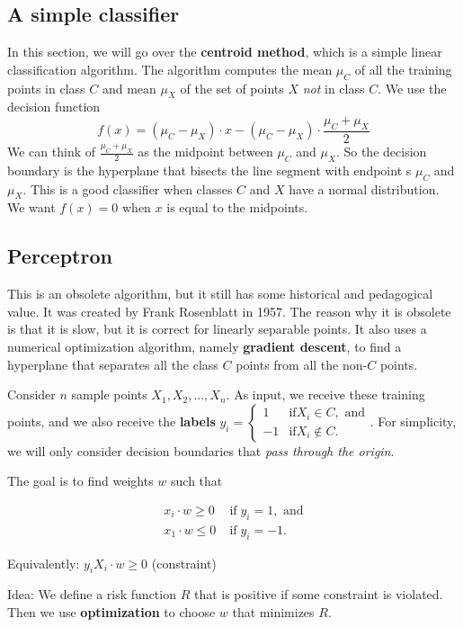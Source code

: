 \subsection{A simple classifier}
In this section, we will go over the \textbf{centroid method}, which is a simple linear classification algorithm.
The algorithm computes the mean $\mu_C$ of all the training points in class $C$ and mean $\mu_X$ of the set of points $X$ \textit{not} in class $C$.
We use the decision function
$$f(x) = (\mu_C - \mu_X) \cdot x - (\mu_C - \mu_X )\cdot \frac{\mu_C + \mu_X}{2}$$
We can think of $\frac{\mu_C + \mu_X}{2}$ as the midpoint between $\mu_C$ and $\mu_X$.
So the decision boundary is the hyperplane that bisects the line segment with endpoint s $\mu_C$ and $\mu_X$.
This is a good classifier when classes $C$ and $X$ have a normal distribution.
We want $f(x) = 0$ when $x$ is equal to the midpoints.

\subsection{Perceptron}
This is an obsolete algorithm, but it still has some historical and pedagogical value.
It was created by Frank Rosenblatt in 1957.
The reason why it is obsolete is that it is slow, but it is correct for linearly separable points.
It also uses a numerical optimization algorithm, namely \textbf{gradient descent}, to find a hyperplane that separates all the class $C$ points from all the non-$C$ points.

Consider $n$ sample points $X_1, X_2, ..., X_n$.
As input, we receive these training points, and we also receive the \textbf{labels} 
$y_i = \begin{cases}
    1
    &\text{if} X_i \in C, \text{ and} \\
    -1
    &\text{if} X_i \notin C.
\end{cases}$.
For simplicity, we will only consider decision boundaries that \textit{pass through the origin}.

The goal is to find weights $w$ such that

\begin{align*}
     x_i \cdot w \geq 0 \;&\text{if}\; y_i = 1, \text{ and}\\
     x_1 \cdot w \leq 0 \; &\text{if}\; y_i = -1.
\end{align*}

Equivalently: $y_i X_i \cdot w \geq 0$ (constraint)

Idea: We define a risk function $R$ that is positive if some constraint is violated.
Then we use \textbf{optimization} to choose $w$ that minimizes $R$.

